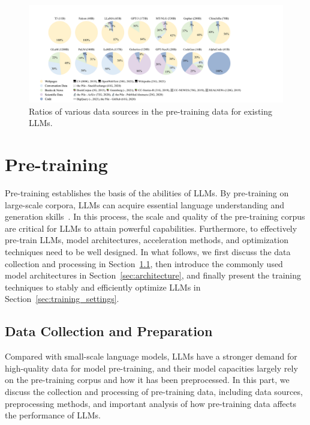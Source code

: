 \begin{figure}
    \centering
    \includegraphics[width=\textwidth]{images/source_ratio_1009.pdf}
    \caption{Ratios of various data sources in the pre-training data for existing  LLMs. }
    \label{fig:source-ratio}
\end{figure}

\section{Pre-training}
\label{sec-pretraining}

Pre-training establishes the basis of the abilities of LLMs. By pre-training on large-scale corpora, LLMs can acquire essential language understanding and %
{generation} skills~\cite{Brown-NeurIPS-2020-Language,Chowdhery-arxiv-2022-PaLM}.
In this process, the scale and quality of the pre-training corpus are critical for LLMs to attain powerful capabilities.
Furthermore, to effectively pre-train LLMs,  model architectures, acceleration methods, and optimization techniques need to be well designed. In what follows, we  first discuss the data collection and processing in Section~\ref{sec:data_collection}, then introduce the commonly used model architectures in Section~\ref{sec:architecture}, and finally present the training techniques to stably and efficiently  optimize LLMs in Section~\ref{sec:training_settings}.

\subsection{Data Collection and Preparation}
\label{sec:data_collection}
Compared with small-scale language models, LLMs have a stronger demand for high-quality data for model pre-training, and their model capacities  largely rely on the pre-training corpus and how it has been preprocessed. In this part, we discuss the collection and processing of pre-training data, including data sources, preprocessing methods, and important analysis of how pre-training data affects the performance of LLMs.


